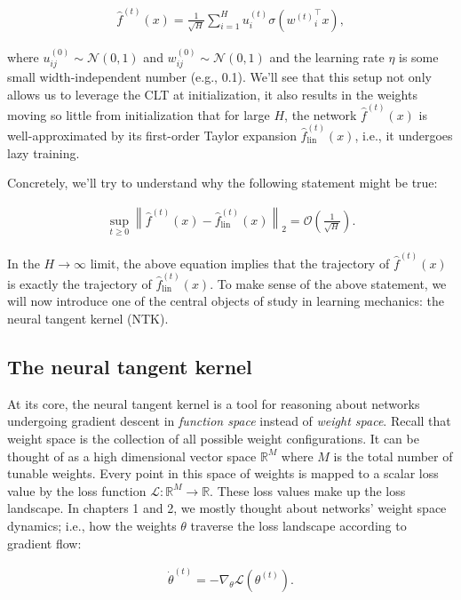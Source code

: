 \begin{align}
\hat{f}^{(t)}(x) = \frac{1}{\sqrt{H}}\sum^H_{i=1}u^{(t)}_i \sigma({w^{(t)}}^\top_i x),
\label{ch3-clt-scaling}
\end{align}

where $u^{(0)}_{ij}\sim\mathcal{N}(0,1)$ and $w^{(0)}_{ij}\sim\mathcal{N}(0,1)$ and the learning rate $\eta$ is some small width-independent number (e.g., 0.1).
We'll see that this setup not only allows us to leverage the CLT at initialization,
it also results in the weights moving so little from initialization that 
for large $H$, the network $\hat{f}^{(t)}(x)$ is well-approximated by
its first-order Taylor expansion $\hat{f}^{(t)}_{\text{lin}}(x)$, i.e., it undergoes lazy training.

Concretely, we'll try to understand why the following statement
might be true:

\begin{align}
\sup_{t\geq 0} \left \| \hat{f}^{(t)}(x) - \hat{f}^{(t)}_{\text{lin}}(x) \right \|_2 = \mathcal{O}\left (\frac{1}{\sqrt{H}}\right ).
\end{align}

In the $H\to\infty$ limit, the above equation implies that
the trajectory of $\hat{f}^{(t)}(x)$ is exactly the trajectory of $\hat{f}^{(t)}_{\text{lin}}(x)$.
To make sense of the above statement, we will now introduce one of the central objects of study
in learning mechanics: the neural tangent kernel (NTK).

\subsection{The neural tangent kernel}

At its core, the neural tangent kernel is a tool for reasoning about 
networks undergoing gradient descent in \textit{function space} instead of \textit{weight space}.
Recall that weight space is the collection of all possible weight configurations.
It can be thought of as a high dimensional vector space $\mathbb{R}^M$ where
$M$ is the total number of tunable weights. Every point in this space of weights
is mapped to a scalar loss value by the loss function $\mathcal{L}:\mathbb{R}^M\to\mathbb{R}$.
These loss values make up the loss landscape.
In chapters 1 and 2, we mostly thought about networks' weight space dynamics; i.e.,
how the weights $\theta$ traverse the loss landscape according to gradient flow:

\begin{align}
\dot{\theta}^{(t)} = -\nabla_{\theta} \mathcal{L}(\theta^{(t)}).
\end{align}

